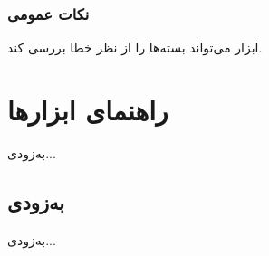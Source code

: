 \documentclass[a4paper, oneside, 11pt]{book}
\begin{document}
\subsection{نکات عمومی}
ابزار \href{http://wiki.archlinux.org/index.php/Namcap}{} می‌تواند
بسته‌ها را از نظر خطا بررسی کند.


\chapter{راهنمای ابزارها}
به‌زودی...

\section{به‌زودی}
به‌زودی...

\appendix

\end{document}
